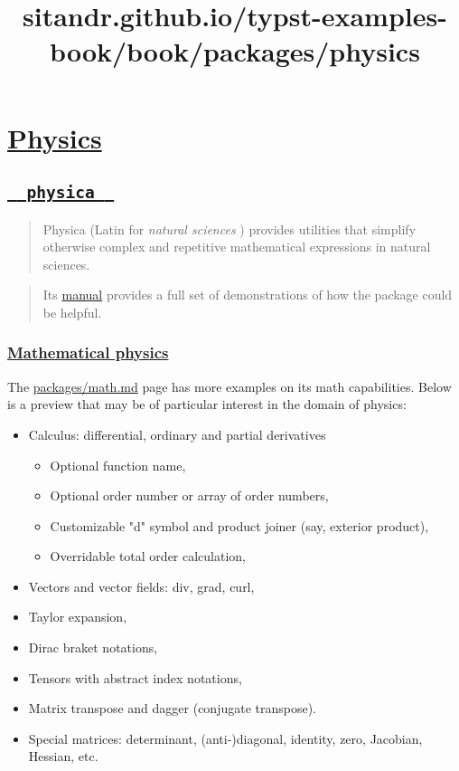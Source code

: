 \title{sitandr.github.io/typst-examples-book/book/packages/physics}

\section{\texorpdfstring{\hyperref[physics]{Physics}}{Physics}}\label{physics}

\subsection{\texorpdfstring{\hyperref[physica]{\texttt{\ }{\texttt{\ physica\ }}\texttt{\ }}}{  physica  }}\label{physica}

\begin{quote}
Physica (Latin for \emph{natural sciences} ) provides utilities that
simplify otherwise complex and repetitive mathematical expressions in
natural sciences.
\end{quote}

\begin{quote}
Its
\href{https://github.com/Leedehai/typst-physics/blob/master/physica-manual.pdf}{manual}
provides a full set of demonstrations of how the package could be
helpful.
\end{quote}

\subsubsection{\texorpdfstring{\hyperref[mathematical-physics]{Mathematical
physics}}{Mathematical physics}}\label{mathematical-physics}

The \href{./math.html\#common-notations}{packages/math.md} page has more
examples on its math capabilities. Below is a preview that may be of
particular interest in the domain of physics:

\begin{itemize}
\tightlist
\item
  Calculus: differential, ordinary and partial derivatives

  \begin{itemize}
  \tightlist
  \item
    Optional function name,
  \item
    Optional order number or array of order numbers,
  \item
    Customizable "d" symbol and product joiner (say, exterior product),
  \item
    Overridable total order calculation,
  \end{itemize}
\item
  Vectors and vector fields: div, grad, curl,
\item
  Taylor expansion,
\item
  Dirac braket notations,
\item
  Tensors with abstract index notations,
\item
  Matrix transpose and dagger (conjugate transpose).
\item
  Special matrices: determinant, (anti-)diagonal, identity, zero,
  Jacobian, Hessian, etc.
\end{itemize}

